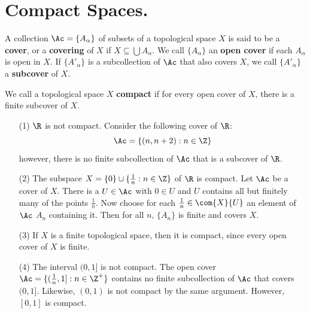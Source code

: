 
\section{Compact Spaces.}

\begin{definition}
    A collection $\Ac=\{A_{\alpha}\}$ of subsets of a topological space $X$ is said to be a  \textbf{cover}, or a
    \textbf{covering} of $X$ if  $X \subseteq \bigcup{A_\alpha}$. We call
    $\{A_\alpha\}$ an \textbf{open cover} if each $A_\alpha$
    is open in  $X$. If  $\{A'_\alpha\}$ is a subcollection of $\Ac$ that also covers $X$, we call
    $\{A'_\alpha\}$ a \textbf{subcover} of $X$.
\end{definition}

\begin{definition}
    We call a topological space $X$ \textbf{compact} if for every open cover of $X$, there is a
    finite subcover of $X$.
\end{definition}

\begin{example}
    \begin{enumerate}
        \item[(1)] $\R$ is not compact. Consider the following cover of  $\R$:
            \begin{equation*}
                \Ac=\{(n,n+2):n \in \Z\}
            \end{equation*}
            however, there is no finite subcollection of $\Ac$ that is a subcover of  $\R$.

        \item[(2)] The subspace $X=\{0\} \cup \{\frac{1}{n}: n \in \Z\}$ of $\R$ is compact. Let  $\Ac$
            be a cover of  $X$. There is a  $U \in \Ac$ with  $0 \in U$ and $U$ contains all but
            finitely many of the points  $ \frac{1}{n}$. Now choose for each $\frac{1}{n} \in
            \com{X}{U}$ an element of $\Ac$ $A_{n}$ containing it. Then for all $n$,  $\{A_n\}$ is
            finite and covers $X$.

        \item[(3)] If  $X$ is a finite topological space, then it is compact, since every open cover of
            $X$ is finite.

        \item[(4)] The interval  $(0,1]$ is not compact. The open cover $\Ac=\{(\frac{1}{n}, 1]: n \in
            \Z^+\}$ contains no finite subcollection of $\Ac$ that covers  $(0,1]$. Likewise,
            $(0,1)$ is not compact by the same argument. However, $[0,1]$ is compact.
    \end{enumerate}
\end{example}

